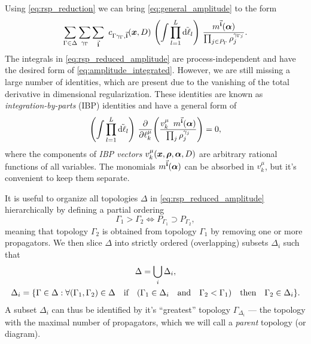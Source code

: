 Using \cref{eq:rsp_reduction} we can bring \cref{eq:general_amplitude} to the form 
\begin{equation} \label{eq:rsp_reduced_amplitude}
  \sum_{\Gamma \in \Delta} \sum_{\gamma_\Gamma} \sum_{\va{i}} ~ c_{\Gamma\gamma_\Gamma, \va{i}} (\vb*{x},D) ~ 
  \qty(\int \prod_{l=1}^{L} \tilde{\dd{\ell_l}}) ~  
  \frac{m^{\va{i}}(\vb*{\alpha})%
    }{\prod_{j\in P_\Gamma} \rho_j^{\gamma_{\Gamma j}}}.
\end{equation}
The integrals in \cref{eq:rsp_reduced_amplitude} are process-independent and have the desired form of \cref{eq:amplitude_integrated}.
However, we are still missing a large number of identities, which are present due to the vanishing of the total derivative in dimensional regularization.
These identities are known as \emph{integration-by-parts} (IBP) identities \cite{Chetyrkin:1981qh,Tkachov:1981wb} and have a general
form of
\begin{equation}
  \qty(\int \prod_{l=1}^{L} \tilde{\dd{\ell_l}}) ~  \pdv{\ell_k^\mu}(
  \frac{ v_k^\mu \ommit{(\vb*{x},\vb*{\rho},\vb*{\alpha},D)} ~ \, m^{\va{i}}(\vb*{\alpha})
    }{\prod_{j} \rho_j^{\gamma_{j}}}
    ) = 0,
  \label{eq:ibps}
\end{equation}
where the components of \emph{IBP vectors} $v_k^\mu(\vb*{x},\vb*{\rho},\vb*{\alpha},D)$ are arbitrary rational functions
of all variables. The monomials $m^{\va{i}}(\vb*{\alpha})$ can be absorbed in $v_k^\mu$, but
it's convenient to keep them separate.

It is useful to organize all topologies $\Delta$ in \cref{eq:rsp_reduced_amplitude}
hierarchically by defining a partial ordering
\begin{equation} \label{eq:topology_order}
    \Gamma_1 > \Gamma_2 \iff P_{\Gamma_1} \supset P_{\Gamma_2},
\end{equation}
meaning that topology $\Gamma_2$ is obtained from topology $\Gamma_1$ by removing one or more propagators.
We then slice $\Delta$ into strictly ordered (overlapping) subsets $\Delta_i$ such that
\begin{subequations} \label{eq:topology_sequence}
    \begin{gather}
         \Delta = \bigcup_i \Delta_i,  \\
         \Delta_i  = \{\Gamma \in \Delta : \forall (\Gamma_1, \Gamma_2) \in\Delta \qif\qty( \Gamma_1 \in \Delta_i \qand \Gamma_2 < \Gamma_1) \qthen \Gamma_2 \in \Delta_i \}.
    \end{gather}
\end{subequations}
A subset $\Delta_i$ can thus be identified by it's ``greatest'' topology $\Gamma_{\Delta_i}$ ---
the topology with the maximal number of propagators, which we will call a \emph{parent} topology (or diagram).

